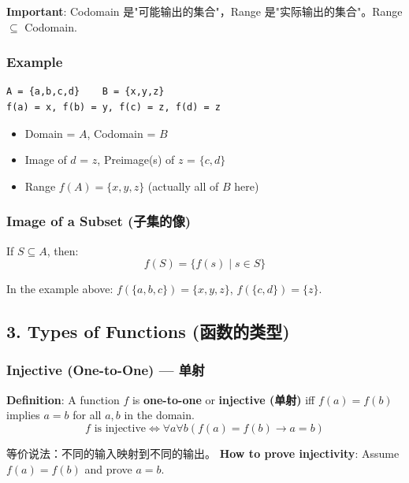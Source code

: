 \documentclass[10pt,a4paper,openany]{ctexbook}
\theoremstyle{definition}
\theoremstyle{remark}
\renewenvironment{quote}
  {\list{}{\leftmargin=1em\rightmargin=0pt\topsep=0.5pt\partopsep=0pt}\item[]}
  {\endlist}
\begin{document}
\begin{quote}
\textbf{Important}: Codomain 是"可能输出的集合"，Range 是"实际输出的集合"。Range $\subseteq$ Codomain.

\end{quote}

\subsubsection{Example}

{\footnotesize\begin{verbatim}
A = {a,b,c,d}    B = {x,y,z}
f(a) = x, f(b) = y, f(c) = z, f(d) = z
\end{verbatim}}

\begin{itemize}
\item Domain = $A$, Codomain = $B$
\item Image of $d$ = $z$, Preimage(s) of $z$ = $\{c,d\}$
\item Range $f(A) = \{x, y, z\}$ (actually all of $B$ here)

\end{itemize}

\subsubsection{Image of a Subset (子集的像)}

If $S \subseteq A$, then:
\[
f(S) = \{f(s) \mid s \in S\}
\]

In the example above: $f(\{a,b,c\}) = \{x, y, z\}$, $f(\{c,d\}) = \{z\}$.
\vspace{-2pt}

\subsection{3. Types of Functions (函数的类型)}

\subsubsection{Injective (One-to-One) — 单射}

\textbf{Definition}: A function $f$ is \textbf{one-to-one} or \textbf{injective (单射)} iff $f(a) = f(b)$ implies $a = b$ for all $a, b$ in the domain.
\[
f \text{ is injective} \iff \forall a \forall b (f(a) = f(b) \to a = b)
\]

等价说法：不同的输入映射到不同的输出。
\textbf{How to prove injectivity}: Assume $f(a) = f(b)$ and prove $a = b$.
\end{document}
